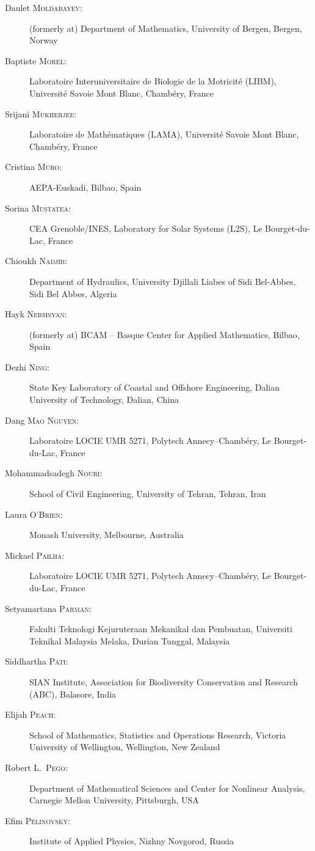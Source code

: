\documentclass[final, a4paper, oneside, 12pt]{article}
\numberwithin{equation}{section}
\begin{document}
\begin{description}
  \item[Daulet \textsc{Moldabayev}:] (formerly at) Department of Mathematics, University of Bergen, Bergen, Norway
  \item[Baptiste \textsc{Morel}:] Laboratoire Interuniversitaire de Biologie de la Motricit\'e (LIBM), Universit\'e Savoie Mont Blanc, Chamb\'ery, France
  \item[Srijani \textsc{Mukherjee}:] Laboratoire de Math\'ematiques (LAMA), Universit\'e Savoie Mont Blanc, Chamb\'ery, France
  \item[Cristina \textsc{Muro}:] AEPA-Euskadi, Bilbao, Spain
  \item[Sorina \textsc{Mustatea}:] CEA Grenoble/INES, Laboratory for Solar Systems (L2S), Le Bourget-du-Lac, France
  \item[Chioukh \textsc{Nadjib}:] Department of Hydraulics, University Djillali Liabes of Sidi Bel-Abbes, Sidi Bel Abbes, Algeria
  \item[Hayk \textsc{Nersisyan}:] (formerly at) BCAM -- Basque Center for Applied Mathematics, Bilbao, Spain
  \item[Dezhi \textsc{Ning}:] State Key Laboratory of Coastal and Offshore Engineering, Dalian University of Technology, Dalian, China
  \item[Dang \textsc{Mao Nguyen}:] Laboratoire LOCIE UMR 5271, Polytech Annecy--Chamb\'ery, Le Bourget-du-Lac, France
  \item[Mohammadsadegh \textsc{Nouri}:] School of Civil Engineering, University of Tehran, Tehran, Iran
  \item[Laura \textsc{O'Brien}:] Monash University, Melbourne, Australia
  \item[Mickael \textsc{Pailha}:] Laboratoire LOCIE UMR 5271, Polytech Annecy--Chamb\'ery, Le Bourget-du-Lac, France
  \item[Setyamartana \textsc{Parman}:] Fakulti Teknologi Kejuruteraan Mekanikal dan Pembuatan, Universiti Teknikal Malaysia Melaka, Durian Tunggal, Malaysia
  \item[Siddhartha \textsc{Pati}:] SIAN Institute, Association for Biodiversity Conservation and Research (ABC), Balasore, India
  \item[Elijah \textsc{Peach}:] School of Mathematics, Statistics and Operations Research, Victoria University of Wellington, Wellington, New Zealand
  \item[Robert L.~\textsc{Pego}:] Department of Mathematical Sciences and Center for Nonlinear Analysis, Carnegie Mellon University, Pittsburgh, USA
  \item[Efim \textsc{Pelinovsky}:] Institute of Applied Physics, Nizhny Novgorod, Russia

\end{description}
\end{document}
